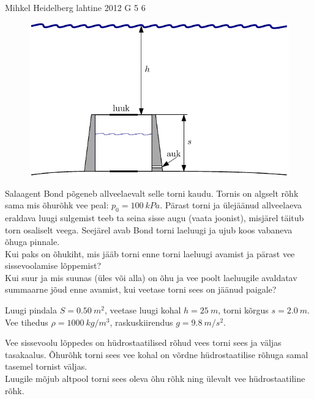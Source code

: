 {Mihkel Heidelberg} %
{lahtine} %
{2012} %
{G 5} %
{6} %
{
\ifStatement
\begin{figure}%
\includegraphics[width=\linewidth]{2012-lahg-05-allveelaev_g}%
\end{figure}
Salaagent Bond põgeneb allveelaevalt selle torni kaudu. Tornis on algselt
rõhk sama mis õhurõhk vee peal: $p_0 = \SI{100}{kPa}$. Pärast torni ja ülejäänud
allveelaeva eraldava luugi sulgemist teeb ta seina sisse augu (vaata joonist), misjärel
täitub torn osaliselt veega. Seejärel avab Bond torni laeluugi ja ujub
koos vabaneva õhuga pinnale.\\
\osa Kui paks on õhukiht, mis jääb torni enne torni
laeluugi avamist ja pärast vee sissevoolamise lõppemist?\\
\osa Kui suur ja mis suunas (üles või alla) on õhu ja vee poolt laeluugile avaldatav summaarne jõud enne
avamist, kui veetase torni sees on jäänud paigale?
\par
Luugi pindala $S =
\SI{0,50}{m^2}$, veetase luugi kohal $h=\SI{25}{m}$, torni kõrgus 
$s=\SI{2,0}{m}$. Vee tihedus $\rho = \SI{1000}{kg/m^3}$, raskuskiirendus $g =
\SI{9,8}{m/s^2}$.
\fi


\ifHint
\osa Vee sissevoolu lõppedes on hüdrostaatilised rõhud vees torni sees ja väljas tasakaalus. Õhurõhk torni sees vee kohal on võrdne hüdrostaatilise rõhuga samal tasemel tornist väljas.\\
\osa Luugile mõjub altpool torni sees oleva õhu rõhk ning ülevalt vee hüdrostaatiline rõhk.
\fi


}
